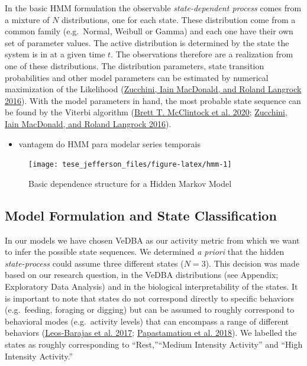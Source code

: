 \documentclass[english,msc,numbers,hidelinks]{coppe}
\providecommand{\tightlist}{%
  \setlength{\itemsep}{0pt}\setlength{\parskip}{0pt}}
\begin{document}
  In the basic HMM formulation the observable \emph{state-dependent process} comes from a mixture of \(N\) distributions, one for each state. These distribution come from a common family (e.g.~Normal, Weibull or Gamma) and each one have their own set of parameter values. The active distribution is determined by the state the system is in at a given time \(t\). The observations therefore are a realization from one of these distributions. The distribution parameters, state transition probabilities and other model parameters can be estimated by numerical maximization of the Likelihood (\protect\hyperlink{ref-zucchini2016}{Zucchini, Iain MacDonald, and Roland Langrock 2016}). With the model parameters in hand, the most probable state sequence can be found by the Viterbi algorithm (\protect\hyperlink{ref-mcclintock2020}{Brett T. McClintock et al. 2020}; \protect\hyperlink{ref-zucchini2016}{Zucchini, Iain MacDonald, and Roland Langrock 2016}).
  \begin{itemize}
  \tightlist
  \item
    vantagem do HMM para modelar series temporais
  \end{itemize}
  \begin{figure}

  {\centering \texttt{[image: tese\_jefferson\_files/figure-latex/hmm-1]} 

  }

  \caption{Basic dependence structure for a Hidden Markov Model}\label{fig:hmm}
  \end{figure}
  \hypertarget{model-formulation-and-state-classification}{%
  \subsection{Model Formulation and State Classification}\label{model-formulation-and-state-classification}}

  In our models we have chosen VeDBA as our activity metric from which we want to infer the possible state sequences. We determined \emph{a priori} that the hidden \emph{state-process} could assume three different states (\(N=3\)). This decision was made based on our research question, in the VeDBA distributions (see Appendix; Exploratory Data Analysis) and in the biological interpretability of the states. It is important to note that states do not correspond directly to specific behaviors (e.g.~feeding, foraging or digging) but can be assumed to roughly correspond to behavioral modes (e.g.~activity levels) that can encompass a range of different behaviors (\protect\hyperlink{ref-leosbarajas2017}{Leos-Barajas et al. 2017}; \protect\hyperlink{ref-papastamatiou2018}{Papastamatiou et al. 2018}). We labelled the states as roughly corresponding to ``Rest,''``Medium Intensity Activity'' and ``High Intensity Activity.''
\end{document}

